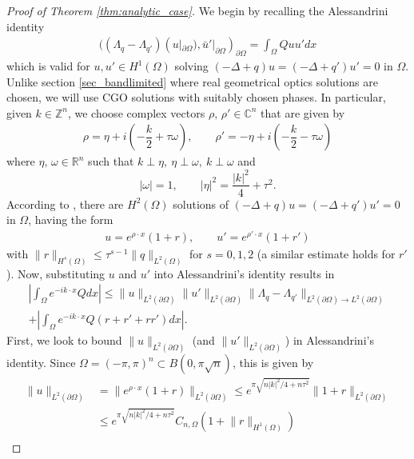 \documentclass[a4paper, 11pt, twoside, notitlepage]{amsart}
\theoremstyle{definition}
\theoremstyle{remark}
\newcommand{\f}[1]{\footnote{\textcolor{blue}{#1}}}
\newcommand {\p} {\partial}
\newcommand{\norm}[1]{\lVert #1 \rVert}
\begin{document}
\begin{proof}[Proof of Theorem \ref{thm:analytic_case}]
We begin by recalling the Alessandrini identity 
\begin{align*}
    ((\Lambda_q-\Lambda_{q'})(u|_{\p\Omega}), \bar{u}'|_{\p\Omega})_{\p\Omega}=\int_\Omega Quu' dx
\end{align*}
which is valid for $u,u'\in H^1(\Omega)$ solving $(-\Delta+q)u=(-\Delta+q')u'=0$ in $\Omega$. Unlike section \ref{sec_bandlimited} where real geometrical optics solutions are chosen, we will use CGO solutions with suitably chosen phases. In particular, given $k\in \mathbb{Z}^n$, we choose complex vectors $\rho,\, \rho'\in \mathbb{C}^n$ that are given by 
\begin{align*}
    \rho = \eta + i\left(-\dfrac{k}{2}+\tau \omega\right),\qquad \rho' = -\eta+i\left(-\dfrac{k}{2}-\tau \omega \right)
\end{align*}
where $\eta,\, \omega\in \mathbb{R}^n$ such that $k\perp\eta,\ \eta \perp\omega,\ k\perp \omega$ and
\[
|\omega|=1,\qquad |\eta|^2=\dfrac{|k|^2}{4}+\tau^2.
\]
According to \cite{feldman_calderproblem_nodate}, there are $H^2(\Omega)$ solutions of $(-\Delta+q)u=(-\Delta+q')u'=0$ in $\Omega$, having the form 
\begin{align*}
    u = e^{\rho\cdot x}(1+r), \qquad u' = e^{\rho'\cdot x} (1+r')
\end{align*}
with $\|r\|_{H^s(\Omega)}\leq \tau^{s-1}\|q\|_{L^2(\Omega)}$ for $s=0,1,2$ (a similar estimate holds for $r'$). Now, substituting $u$ and $u'$ into Alessandrini's identity results in 
\begin{align*}
       \left|\int_\Omega e^{-ik\cdot x}Q dx\right| \leq \|u\|_{L^2(\p\Omega)}\|u'\|_{L^2(\p\Omega)}\|\Lambda_q-\Lambda_{q'}\|_{L^2(\p\Omega)\rightarrow L^2(\p\Omega)}\\+\left|\int_\Omega e^{-ik\cdot x}Q(r+r'+rr')dx\right|.
\end{align*}
First, we look to bound $\|u\|_{L^2(\p\Omega)}$ (and $\|u'\|_{L^2(\p\Omega)}$) in Alessandrini's identity. Since $\Omega = (-\pi,\pi)^n\subset B(0,\pi\sqrt{n})$, this is given by %
\begin{align*}
    \|u\|_{L^2(\p\Omega)} &= \|e^{\rho\cdot x}(1+r)\|_{L^2(\p\Omega)} \leq e^{\pi\sqrt{n|k|^2/4+n\tau^2}} \norm{1+r}_{L^2(\p \Omega)} \\ 
    &\leq e^{\pi\sqrt{n|k|^2/4+n\tau^2}} C_{n,\Omega}(1 + \norm{r}_{H^1(\Omega)}) \\

\end{align*}
\end{proof}
\end{document}

